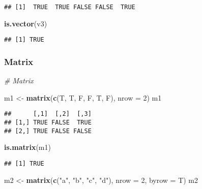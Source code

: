 \documentclass[
]{article}
\newenvironment{Shaded}{\begin{snugshade}}{\end{snugshade}}
\newcommand{\AttributeTok}[1]{\textcolor[rgb]{0.13,0.29,0.53}{#1}}
\newcommand{\CommentTok}[1]{\textcolor[rgb]{0.56,0.35,0.01}{\textit{#1}}}
\newcommand{\DecValTok}[1]{\textcolor[rgb]{0.00,0.00,0.81}{#1}}
\newcommand{\FunctionTok}[1]{\textcolor[rgb]{0.13,0.29,0.53}{\textbf{#1}}}
\newcommand{\NormalTok}[1]{#1}
\newcommand{\OtherTok}[1]{\textcolor[rgb]{0.56,0.35,0.01}{#1}}
\newcommand{\StringTok}[1]{\textcolor[rgb]{0.31,0.60,0.02}{#1}}
\begin{document}
\begin{verbatim}
## [1]  TRUE  TRUE FALSE FALSE  TRUE
\end{verbatim}

\begin{Shaded}
\begin{Highlighting}[]
\FunctionTok{is.vector}\NormalTok{(v3)}
\end{Highlighting}
\end{Shaded}

\begin{verbatim}
## [1] TRUE
\end{verbatim}

\subsubsection{Matrix}\label{matrix}

\begin{Shaded}
\begin{Highlighting}[]
\CommentTok{\# Matrix}

\NormalTok{m1 }\OtherTok{\textless{}{-}} \FunctionTok{matrix}\NormalTok{(}\FunctionTok{c}\NormalTok{(T, T, F, F, T, F), }\AttributeTok{nrow =} \DecValTok{2}\NormalTok{)}
\NormalTok{m1}
\end{Highlighting}
\end{Shaded}

\begin{verbatim}
##      [,1]  [,2]  [,3]
## [1,] TRUE FALSE  TRUE
## [2,] TRUE FALSE FALSE
\end{verbatim}

\begin{Shaded}
\begin{Highlighting}[]
\FunctionTok{is.matrix}\NormalTok{(m1)}
\end{Highlighting}
\end{Shaded}

\begin{verbatim}
## [1] TRUE
\end{verbatim}

\begin{Shaded}
\begin{Highlighting}[]
\NormalTok{m2 }\OtherTok{\textless{}{-}} \FunctionTok{matrix}\NormalTok{(}\FunctionTok{c}\NormalTok{(}\StringTok{"a"}\NormalTok{, }\StringTok{"b"}\NormalTok{, }
               \StringTok{"c"}\NormalTok{, }\StringTok{"d"}\NormalTok{), }
               \AttributeTok{nrow =} \DecValTok{2}\NormalTok{,}
               \AttributeTok{byrow =}\NormalTok{ T)}
\NormalTok{m2}
\end{Highlighting}
\end{Shaded}
\end{document}
